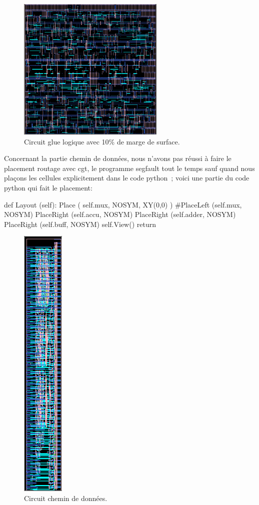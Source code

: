 \documentclass[12pt]{article}
\begin{document}
\begin{figure}
\begin{center}
  \includegraphics[width = 7cm]{pic/standard2.png}
\end{center}
\caption{Circuit glue logique avec 10\% de marge de surface.}
\end{figure}

Concernant la partie chemin de données, nous n'avons pas réussi à faire le placement routage avec cgt, le programme segfault tout le temps sauf quand nous plaçons les cellules explicitement dans le code python ;  voici une partie du code python qui fait le placement:

\begin{python}
def Layout (self):
		Place ( self.mux, NOSYM, XY(0,0) )
		#PlaceLeft (self.mux, NOSYM)
		PlaceRight (self.accu, NOSYM)
		PlaceRight (self.adder, NOSYM)
		PlaceRight (self.buff, NOSYM)	
		self.View()
		return	
\end{python}

\begin{figure}
\begin{center}
  \includegraphics[width = 2cm]{pic/datapath.png}
\end{center}
\caption{Circuit chemin de données.}
\end{figure}
\newpage
\end{document}

